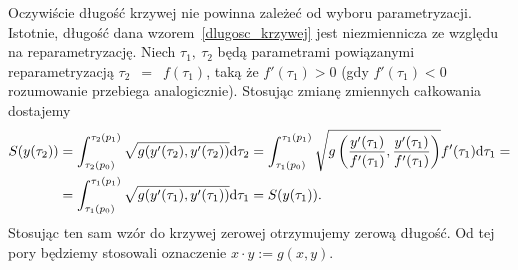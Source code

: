 Oczywiście 
długość krzywej nie powinna zależeć od wyboru parametryzacji.
Istotnie, długość dana wzorem~\eqref{dlugosc_krzywej}
jest niezmiennicza ze względu na reparametryzację.
Niech $\tau_1,\ \tau_2$ będą parametrami powiązanymi 
reparametryzacją  $\tau_2$~$=$~$f(\tau_1)$, taką że 
$f'(\tau_1) > 0$ (gdy $f'(\tau_1) <0$ rozumowanie 
przebiega analogicznie).
Stosując zmianę zmiennych całkowania dostajemy
\begin{align*}
S(y(\tau_2)) &= 
\int_{\tau_2(p_0)}^{\tau_2(p_1)} \sqrt{g (
y' (\tau_2), y' (\tau_2) )} \text{d} \tau_2  = 
\int_{\tau_1(p_0)}^{\tau_1(p_1)} \sqrt{g \left(
\frac{ y' (\tau_1) }{ f'(\tau_1)}, 
\frac{ y' (\tau_1) }{ f'(\tau_1)} \right)} 
f'(\tau_1) \text{d} \tau_1 = \\
& = 
\int_{\tau_1(p_0)}^{\tau_1(p_1)} \sqrt{g (
y' (\tau_1), y' (\tau_1)  )} \text{d} \tau_1  
=S(y(\tau_1)).
\end{align*}
Stosując ten sam wzór do krzywej zerowej otrzymujemy zerową
długość. Od tej pory będziemy stosowali 
oznaczenie $ x\cdot y := g(x,y)$.

